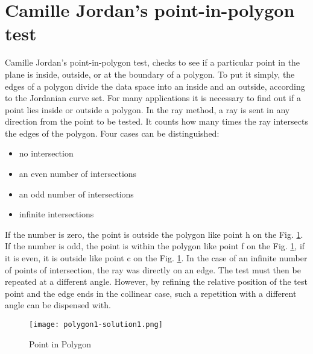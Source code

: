\documentclass[12pt,a4paper]{scrreprt}
\begin{document}
\section{Camille Jordan's point-in-polygon test}
\begin{flushleft}
Camille Jordan's point-in-polygon test, checks to see if a particular point in the plane is inside, outside, or at the boundary of a polygon. To put it simply, the edges of a polygon divide the data space into an inside and an outside, according to the Jordanian curve set. For many applications it is necessary to find out if a point lies inside or outside a polygon. In the ray method, a ray is sent in any direction from the point to be tested. It counts how many times the ray intersects the edges of the polygon. Four cases can be distinguished:\\

\vspace{0.1cm}
\begin{itemize}
\item no intersection
\item an even number of intersections
\item an odd number of intersections
\item infinite intersections
\end{itemize}
\vspace{0.1cm}

If the number is zero, the point is outside the polygon like point h on the Fig. \ref{figure1}. If the number is odd, the point is within the polygon like point f on the Fig. \ref{figure1}, if it is even, it is outside like point c on the Fig. \ref{figure1}. In the case of an infinite number of points of intersection, the ray was directly on an edge. The test must then be repeated at a different angle. However, by refining the relative position of the test point and the edge ends in the collinear case, such a repetition with a different angle can be dispensed with. 
\end{flushleft}

\begin{figure}[b] 
\centering
\texttt{[image: polygon1-solution1.png]}
\renewcommand{\figurename}{Fig.}
\caption{Point in Polygon} 
\label{figure1}
\end{figure}

\newpage
\end{document}
